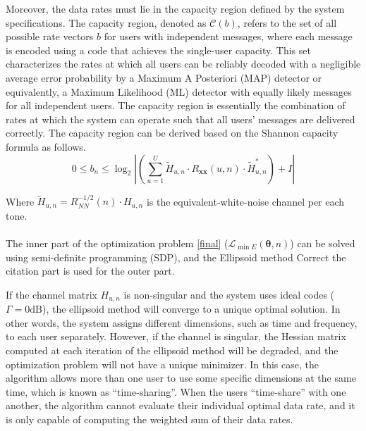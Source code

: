Moreover, the data rates must lie in the capacity region defined by the system specifications. The capacity region, denoted as $\mathcal{C}(b)$, refers to the set of all possible rate vectors $b$ for users with independent messages, where each message is encoded using a code that achieves the single-user capacity. This set characterizes the rates at which all users can be reliably decoded with a negligible average error probability by a Maximum A Posteriori (MAP) detector or equivalently, a Maximum Likelihood (ML) detector with equally likely messages for all independent users. The capacity region is essentially the combination of rates at which the system can operate such that all users' messages are delivered correctly. %
The capacity region can be derived based on the Shannon capacity formula as follows\cite{shannon}. 
\begin{equation}
0 \leq b_n %
\leq \log _2\left|\left(\sum_{u=1}^U \widetilde{H}_{u, n} \cdot R_{\boldsymbol{x} \boldsymbol{x}}(u, n) \cdot \widetilde{H}_{u, n}^*\right)+I\right|
\end{equation}

Where $\tilde{H}_{u, n}=R_{N N}^{-1 / 2}(n) \cdot H_{u, n}$ is the equivalent-white-noise channel per each tone. \\\\


The inner part of the optimization problem \ref{final} ($\mathcal{L}_{\min E}(\boldsymbol{\theta}, n)$) can be solved using semi-definite programming (SDP), and the Ellipsoid method \cite{yudin1976constrained} {\color{red} Correct the citation part} is used for the outer part. 

If the channel matrix $H_{u,n}$ is non-singular and the system uses ideal codes ($\Gamma = 0 \textrm{dB}$), the ellipsoid method will converge to a unique optimal solution. In other words, the system assigns different dimensions, such as time and frequency, to each user separately. However, if the channel is singular, the Hessian matrix computed at each iteration of the ellipsoid method will be degraded, and the optimization problem will not have a unique minimizer. In this case, the algorithm allows more than one user to use some specific dimensions at the same time, which is known as “time-sharing”. When the users “time-share” with one another, the algorithm cannot evaluate their individual optimal data rate, and it is only capable of computing the weighted sum of their data rates.  

